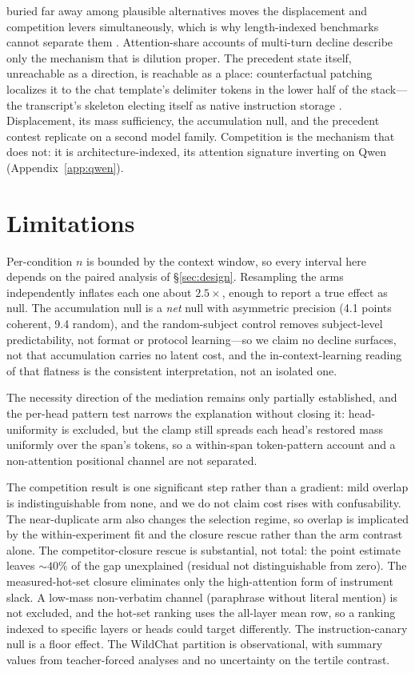 \documentclass{article}
\begin{document}
buried far away among plausible alternatives moves the displacement and competition levers
simultaneously, which is why length-indexed benchmarks cannot separate them
\citep{hsieh2024ruler}. Attention-share accounts of multi-turn decline
\citep{dongre2026attentioncloses} describe only the mechanism that is dilution proper. The
precedent state itself, unreachable as a direction, is reachable as a place: counterfactual
patching localizes it to the chat template's delimiter tokens in the lower half of the
stack---the transcript's skeleton electing itself as native instruction storage
\citep{darcet2023registers,sun2024massiveactivations,mu2023gist}.
Displacement, its mass sufficiency, the accumulation null, and the precedent contest replicate
on a second model family. Competition is the mechanism that does not: it is
architecture-indexed, its attention signature inverting on Qwen (Appendix~\ref{app:qwen}).

\section{Limitations}

Per-condition $n$ is bounded by the context window, so every interval here depends on the paired
analysis of \S\ref{sec:design}. Resampling the arms independently inflates each one about
$2.5\times$, enough to report a true effect as null. The accumulation null is a \emph{net} null
with asymmetric precision (4.1 points coherent, 9.4 random), and the random-subject control
removes subject-level predictability, not format or protocol learning---so we claim no decline
surfaces, not that accumulation carries no latent cost, and the in-context-learning reading of
that flatness is the consistent interpretation, not an isolated one.

The necessity direction of
the mediation remains only partially established, and the per-head pattern test narrows the
explanation without closing it: head-uniformity is excluded, but the clamp still spreads each
head's restored mass uniformly over the span's tokens, so a within-span token-pattern account
and a non-attention positional channel are not separated.

The competition result is one significant step rather than a gradient: mild
overlap is indistinguishable from none, and we do not claim cost rises with confusability. The
near-duplicate arm also changes the selection regime, so overlap is implicated by the
within-experiment fit and the closure rescue rather than the arm contrast alone. The
competitor-closure rescue is substantial, not total: the point estimate
leaves ${\sim}40\%$ of the gap unexplained (residual not distinguishable from zero). The
measured-hot-set closure eliminates only the high-attention form of instrument slack. A
low-mass non-verbatim channel (paraphrase without literal mention) is not excluded, and the
hot-set ranking uses the all-layer mean row, so a ranking indexed to specific layers or heads
could target differently. The instruction-canary null is a floor effect. The WildChat
partition is observational, with summary values from teacher-forced analyses and no uncertainty
on the tertile contrast.
\end{document}
